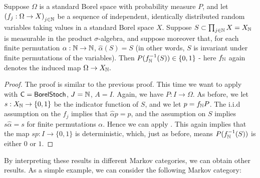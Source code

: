 \documentclass[11pt]{article}
\begin{document}
\begin{corollary}
    Suppose $\Omega$ is a standard Borel space with probability measure $P$, and let $\left(f_j: \Omega \to X\right)_{j\in \mathbb{N}}$ be a sequence of independent, identically distributed random variables taking values in a standard Borel space $X$.
    Suppose $S \subset \prod_{j \in \mathbb{N}} X = X_{\mathbb{N}}$ is measurable in the product $\sigma$-algebra, and suppose moreover that, for each finite permutation $\alpha: \mathbb{N} \to \mathbb{N}$, $\hat{\alpha}(S) = S$ (in other words, $S$ is invariant under finite permutations of the variables).
    Then $P(f_{\mathbb{N}}^{-1}(S)) \in \{0,1\}$ - here $f_{\mathbb{N}}$ again denotes the induced map $\Omega \to X_{\mathbb{N}}.$
\end{corollary}
\begin{proof}
    The proof is similar to the previous proof. This time we want to apply  with $\mathsf{C} = \operatorname{\mathsf{BorelStoch}}$, $J = \mathbb{N}$, $A = I$.
    Again, we have $P: I \to \Omega$.
    As before, we let $s: X_{\mathbb{N}} \to \{0,1\}$ be the indicator function of $S$, and we let $p = f_{\mathbb{N}} P$.
    The i.i.d assumption on the $f_j$ implies that $\hat{\alpha}p = p$, and the assumption on $S$ implies $s\hat{\alpha} = s$ for finite permutations $\alpha$.
    Hence we can apply . This again implies that the map $sp: I \to \{0,1\}$ is deterministic, which, just as before, means 
    $P(f_{\mathbb{N}}^{-1}(S))$ is either $0$ or $1$.
\end{proof} 


By interpreting these results in different Markov categories, we can obtain other results.
As a simple example, we can consider the following Markov category:
\end{document}
